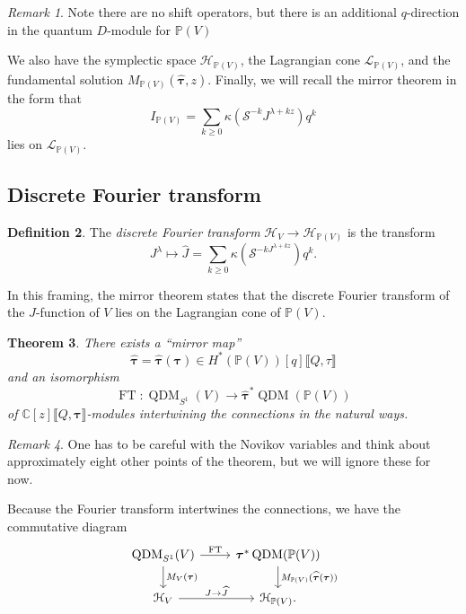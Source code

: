 \documentclass[leqno, openany]{memoir}
\newtheorem{thm}{Theorem}[section]
\theoremstyle{definition}
\newtheorem{defn}[thm]{Definition}
\theoremstyle{remark}
\newtheorem{rmk}[thm]{Remark}
\theoremstyle{plain}
\theoremstyle{definition}
\theoremstyle{remark}
\newcommand{\C}{\mathbb{C}}
\renewcommand{\P}{\mathbb{P}}
\newcommand{\mc}[1]{\mathcal{#1}}
\newcommand{\mr}[1]{\mathrm{#1}}
\newcommand{\on}[1]{\operatorname{#1}}
\newcommand{\wh}[1]{\widehat{#1}}
\DeclareMathOperator{\QDM}{QDM}
\begin{document}
\begin{rmk}
    Note there are no shift operators, but there is an additional $q$-direction in the quantum $D$-module for $\P(V)$
\end{rmk}

We also have the symplectic space $\mc{H}_{\P(V)}$, the Lagrangian cone $\mc{L}_{\P(V)}$, and the fundamental solution $M_{\P(V)}(\wh{\bm{\tau}}, z)$. Finally, we will recall the mirror theorem in the form that
\[ I_{\P(V)} = \sum_{k \geq 0} \kappa(\mc{S}^{-k} J^{\lambda + kz}) q^k \]
lies on $\mc{L}_{\P(V)}$.

\subsection{Discrete Fourier transform}%
\label{sub:Discrete Fourier transform}

\begin{defn}
    The \textit{discrete Fourier transform} $\mc{H}_V \to \mc{H}_{\P(V)}$ is the transform
    \[ J^{\lambda} \mapsto \wh{J} = \sum_{k \geq 0} \kappa(\mc{S}^{-k J^{\lambda + kz}}) q^k. \]
\end{defn}

In this framing, the mirror theorem states that the discrete Fourier transform of the $J$-function of $V$ lies on the Lagrangian cone of $\P(V)$.

\begin{thm}
    There exists a ``mirror map'' 
    \[ \wh{\bm{\tau}} = \wh{\bm{\tau}}(\bm{\tau}) \in H^*(\P(V))[q] \llbracket Q,\tau \rrbracket \]
    and an isomorphism
    \[ \on{FT} \colon \QDM_{S^1}(V) \to \wh{\bm{\tau}}^* \QDM(\P(V)) \]
    of $\C[z] \llbracket Q,\bm{\tau} \rrbracket$-modules intertwining the connections in the natural ways.
\end{thm}

\begin{rmk}
    One has to be careful with the Novikov variables and think about approximately eight other points of the theorem, but we will ignore these for now.
\end{rmk}

Because the Fourier transform intertwines the connections, we have the commutative diagram
\begin{equation*}
\begin{tikzcd}
    \QDM_{S^1}(V) \ar{r}{\mr{FT}} \ar{d}{M_V(\bm{\tau})} & \bm{\tau}^* \QDM(\P(V)) \ar{d}{M_{\P(V)}(\wh{\bm{\tau}}(\bm{\tau}))} \\
    \mc{H}_V \ar{r}{J \to \wh{J}} & \mc{H}_{\P(V)}.
\end{tikzcd}
\end{equation*}
\end{document}

